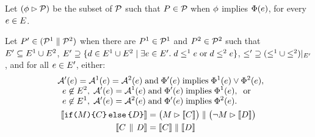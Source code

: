 \begin{definition}
  Let $(\phi \mathbin\rhd \mathcal{P})$ be the subset of $\mathcal{P}$ such that
  $P\in\mathcal{P}$ when $\phi$ implies $\Phi(e)$, for every
  $e\in E$. 


  Let $P' \in (\mathcal{P}^1 \parallel \mathcal{P}^2)$
when there are $P^1 \in \mathcal{P}^1$ and $P^2 \in \mathcal{P}^2$ such that
$E' \subseteq E^1 \cup E^2$,
$E' \supseteq \{ d \in E^1 \cup E^2 \mid
\exists e\in E'.\; d\le^1e \; \allowbreak\text{or}\allowbreak\; d\le^2e\}$,
${\le'}\supseteq({\le^1}\cup{\le^2})\mathbin{|}_{E'}$, and for all $e\in E'$,
either:
\begin{gather*}
  \begin{aligned}
    \;\;&\mathcal{A}'(e) = \mathcal{A}^1(e) = \mathcal{A}^2(e) \;\allowbreak\text{and}\allowbreak\; \Phi'(e) \; \allowbreak\text{implies}\allowbreak\; \Phi^1(e) \lor \Phi^2(e),\\[-1ex]
    &\;\;e \not\in E^2,\; \mathcal{A}'(e) = \mathcal{A}^1(e) \;\allowbreak\text{and}\allowbreak\; \Phi'(e) \; \allowbreak\text{implies}\allowbreak\; \Phi^1(e),\; \; \allowbreak\text{or}\allowbreak\;\\[-1ex]
    &\;\;e \not\in E^1,\; \mathcal{A}'(e) = \mathcal{A}^2(e) \;\allowbreak\text{and}\allowbreak\; \Phi'(e) \; \allowbreak\text{implies}\allowbreak\; \Phi^2(e).
  \end{aligned}
  \\
\begin{aligned}
  \llbracket\texttt{if}\allowbreak\texttt{(}M\texttt{)} \allowbreak\texttt{\{} C \texttt{\}}\,\allowbreak\texttt{else}\allowbreak\,\texttt{\{} D \texttt{\}}\rrbracket & =
  \bigl(M \mathbin\rhd \llbracket C\rrbracket\bigr) \parallel \bigl(\lnot M \mathbin\rhd \llbracket D\rrbracket\bigr) 
  \\
  \llbracket C \,\mathbin{\|}\, D\rrbracket & =
  \llbracket C\rrbracket \parallel \llbracket D\rrbracket 
\end{aligned}
\end{gather*}
\end{definition}

